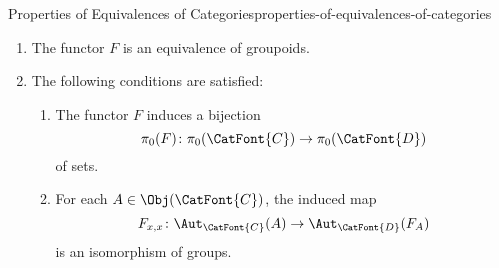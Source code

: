 \begin{proposition}{Properties of Equivalences of Categories}{properties-of-equivalences-of-categories}
\begin{enumerate}
\begin{enumerate}
                \item\label{properties-of-equivalences-of-categories-interaction-with-groupoids-a}The functor $F$ is an equivalence of groupoids.
                \item\label{properties-of-equivalences-of-categories-interaction-with-groupoids-b}The following conditions are satisfied:
                    \begin{enumerate}
                        \item\label{properties-of-equivalences-of-categories-interaction-with-groupoids-b-a}The functor $F$ induces a bijection
                            \[
                                \pi_{0}(F)%
                                \colon%
                                \pi_{0}(\CatFont{C})%
                                \to%
                                \pi_{0}(\CatFont{D})%
                            \]%
                            of sets.
                        \item\label{properties-of-equivalences-of-categories-interaction-with-groupoids-b-b}For each $A\in\Obj(\CatFont{C})$, the induced map
                            \[
                                F_{x,x}%
                                \colon%
                                \Aut_{\CatFont{C}}(A)%
                                \to%
                                \Aut_{\CatFont{D}}(F_{A})%
                            \]%
                            is an isomorphism of groups.
                    \end{enumerate}
            \end{enumerate}
    \end{enumerate}
\end{proposition}
